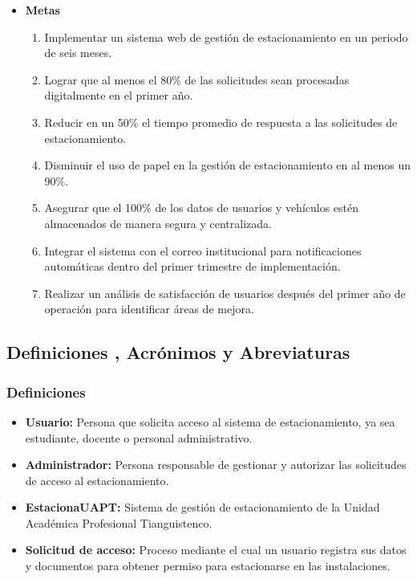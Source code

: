 {\begin{itemize}
{\begin{enumerate}
decisiones
	\end{enumerate}}	
\item{\textbf{Metas}
	\begin{enumerate}
\item Implementar un sistema web de gestión de estacionamiento en un
		periodo de seis meses.
\item Lograr que al menos el 80\% de las solicitudes sean procesadas digitalmente en el primer año.
\item Reducir en un 50\% el tiempo promedio de respuesta a las solicitudes
		de estacionamiento.
\item Disminuir el uso de papel en la gestión de estacionamiento en al
		menos un 90\%.
\item Asegurar que el 100\% de los datos de usuarios y vehículos estén almacenados 
de manera segura y centralizada.
\item Integrar el sistema con el correo institucional para notificaciones automáticas dentro del primer trimestre de implementación.
\item Realizar un análisis de satisfacción de usuarios después del primer
		año de operación para identificar áreas de mejora.
		

	\end{enumerate}
	
}
\end{itemize}
\subsection{ Definiciones , Acrónimos y Abreviaturas}
\subsubsection{Definiciones}
\begin{itemize}
	 \item{\textbf{Usuario: }Persona que solicita acceso al sistema de estacionamiento, ya
	sea estudiante, docente o personal administrativo.}
\item {\textbf{Administrador: }Persona responsable de gestionar y autorizar las solicitudes de acceso al estacionamiento.}
\item {\textbf{EstacionaUAPT: }Sistema de gestión de estacionamiento de la
	Unidad Académica Profesional Tianguistenco.}
\item{ \textbf{Solicitud de acceso: }Proceso mediante el cual un usuario registra sus
	datos y documentos para obtener permiso para estacionarse en las instalaciones.}


\end{itemize}}
